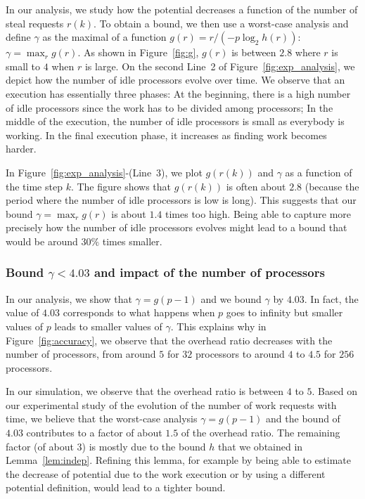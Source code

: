 In our analysis, we study how the potential decreases a function of
the number of steal requests $r(k)$. To obtain a bound, we then use a
worst-case analysis and define $\gamma$ as the maximal of a function
$g(r)=r/(-p\log_2h(r))$: $\gamma=\max_r g(r)$. As shown in
Figure~\ref{fig:g}, $g(r)$ is between $2.8$ where $r$ is small to $4$
when $r$ is large.  On the second Line~2 of
Figure~\ref{fig:exp_analysis}, we depict how the number of idle
processors evolve over time. We observe that an execution has
essentially three phases: At the beginning, there is a high number of
idle processors since the work has to be divided among processors; In
the middle of the execution, the number of idle processors is small as
everybody is working.  In the final execution phase, it increases as
finding work becomes harder.


In Figure~\ref{fig:exp_analysis}-(Line~3), we plot $g(r(k))$ and
$\gamma$ as a function of the time step $k$.  The figure shows that
$g(r(k))$ is often about $2.8$ (because the period where the number of
idle processors is low is long). This suggests that our bound
$\gamma=\max_r g(r)$ is about $1.4$ times too high. Being able to
capture more precisely how the number of idle processors evolves might
lead to a bound that would be around $30\%$ times smaller.

\subsubsection{Bound $\gamma<4.03$ and impact of the number of
  processors}

In our analysis, we show that $\gamma=g(p-1)$ and we bound $\gamma$ by
$4.03$. In fact, the value of $4.03$ corresponds to what happens when
$p$ goes to infinity but smaller values of $p$ leads to smaller values
of $\gamma$. This explains why in Figure~\ref{fig:accuracy}, we
observe that the overhead ratio decreases with the number of processors,
from around $5$ for $32$ processors to around $4$ to $4.5$ for $256$
processors.


\medskip

In our simulation, we observe that the overhead ratio is between $4$
to $5$. Based on our experimental study of the evolution of the number
of work requests with time, we believe that the worst-case analysis
$\gamma=g(p-1)$ and the bound of $4.03$ contributes to a factor of
about $1.5$ of the overhead ratio. The remaining factor (of about $3$)
is mostly due to the bound $h$ that we obtained in
Lemma~\ref{lem:indep}. Refining this lemma, for example by being able
to estimate the decrease of potential due to the work execution or by
using a different potential definition, would lead to a tighter bound.




